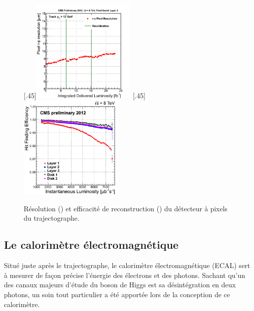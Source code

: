 \begin{figure} \centering
  [.45\textwidth]{\includegraphics[width=0.45\textwidth]{chapitre2/figs/pixel_detector_resolution_over_time.png}}\hfill
  [.45\textwidth]{\includegraphics[width=0.45\textwidth]{chapitre2/figs/pixel_detector_efficiency_over_time.png}}
  \caption{Résolution () et efficacité de reconstruction () du détecteur à pixels du trajectographe.}
\end{figure}

\subsection{Le calorimètre électromagnétique}

Situé juste après le trajectographe, le calorimètre électromagnétique (ECAL) sert à mesurer de façon précise l'énergie des électrons et des photons. Sachant qu'un des canaux majeurs d'étude du boson de Higgs est sa désintégration en deux photons, un soin tout particulier a été apportée lors de la conception de ce calorimètre.

